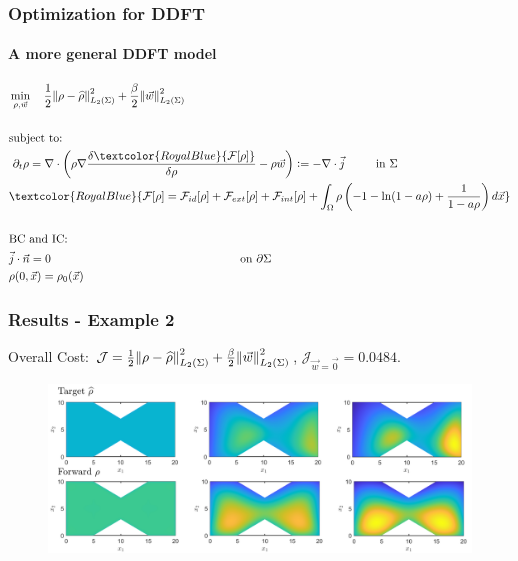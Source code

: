 \documentclass[aspectratio=169,xcolor=dvipsnames]{beamer}
\begin{document}
\begin{frame}
	\frametitle{Optimization for DDFT}
	\framesubtitle{A more general DDFT model}
	\begin{align*}
		&\min_{\rho,\vec{w}} \quad \frac{1}{2}\norm{\rho- \widehat{\rho}}_{L_2(\Sigma)}^2 + \frac{\beta}{2} \norm{ {\vec{w}}}_{L_2(\Sigma)}^2\\
		\\
		&\text{subject to:}
		\\
		& \ \partial_t \rho = \nabla \cdot \left( \rho \nabla \frac{\delta \textcolor{RoyalBlue}{ \mathcal F [\rho]} }{\delta \rho} - \rho  {\vec{w}}\right):= - \nabla \cdot \vec j \qquad \ \ { \text{in    } \Sigma}\qquad\qquad\qquad\qquad\\
		&\textcolor{RoyalBlue}{ \mathcal F [\rho]=  \mathcal F_{id}[\rho] + \mathcal F_{ext}[\rho] +  \mathcal F_{int}[\rho] + \int_\Omega \rho \left(-1 -\ln(1 - a\rho) + \frac{1}{1-a\rho}  \right)d \vec x} \\
		\\
		&{\text{BC } \text{and IC:}}\\
		&\vec j \cdot \vec n = 0 \quad \ \qquad \quad \qquad \qquad\qquad\qquad\qquad\qquad \text{on   } \partial \Sigma   \qquad\qquad\qquad\qquad\qquad \qquad \qquad\qquad \qquad \qquad\\
		&{\rho(0,\vec{x}) = \rho_0(\vec{x})} 
	\end{align*}
\end{frame}
\begin{frame}
	\frametitle{Results - Example 2}
	Overall Cost: $\mathcal J = \frac{1}{2}\norm{\rho- \widehat{\rho}}_{L_2(\Sigma)}^2 + \frac{\beta}{2} \norm{\vec{w}}_{L_2(\Sigma)}^2$, $\mathcal J_{\vec{w}= \vec 0} = 0.0484$.
	\vspace{0.3 cm}
	\begin{figure}
		\includegraphics[width=14cm]{ExRes2a2.png}
	\end{figure}
	
\end{frame}
\end{document}
